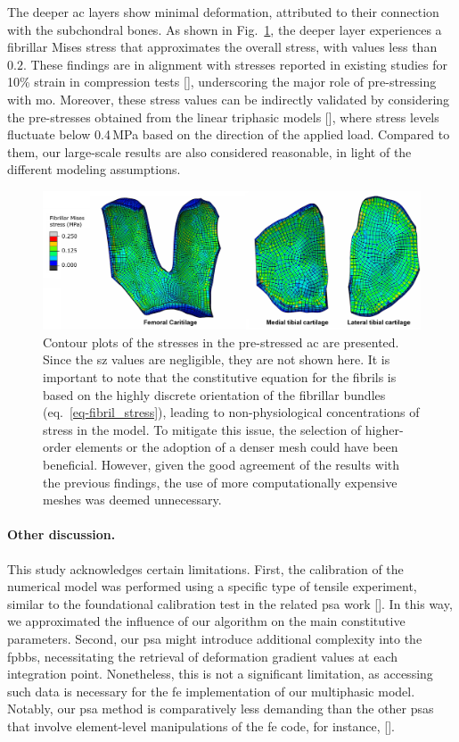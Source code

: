 The deeper \ac{ac} layers show minimal deformation, attributed to their connection with the subchondral bones. As shown in Fig.~\ref{fig:components}, the deeper layer experiences a fibrillar Mises stress that approximates the overall stress, with values less than $0.2$. These findings are in alignment with stresses reported in existing studies for 10\% strain in compression tests [\cite{sajjadinia2019}], underscoring the major role of pre-stressing with \ac{mo}. Moreover, these stress values can be indirectly validated by considering the pre-stresses obtained from the linear triphasic models [\cite{lai1991,setton1996}], where stress levels fluctuate below 0.4\,MPa based on the direction of the applied load. Compared to them, our large-scale results are also considered reasonable, in light of the different modeling assumptions.
%
\begin{figure}[b!]\centering
\includegraphics[width=\textwidth]{img/components.jpg}
\caption{Contour plots of the stresses in the pre-stressed \ac{ac} are presented. Since the \ac{sz} values are negligible, they are not shown here. It is important to note that the constitutive equation for the fibrils is based on the highly discrete orientation of the fibrillar bundles (eq.~\ref{eq-fibril_stress}), leading to non-physiological concentrations of stress in the model. To mitigate this issue, the selection of higher-order elements or the adoption of a denser mesh could have been beneficial. However, given the good agreement of the results with the previous findings, the use of more computationally expensive meshes was deemed unnecessary.}
\label{fig:components}
\end{figure}

\paragraph{Other discussion.} This study acknowledges certain limitations. First, the calibration of the numerical model was performed using a specific type of tensile experiment, similar to the foundational calibration test in the related \ac{psa} work [\cite{wang2018}]. In this way, we approximated the influence of our algorithm on the main constitutive parameters. Second, our \ac{psa} might introduce additional complexity into the \ac{fpbbs}, necessitating the retrieval of deformation gradient values at each integration point. Nonetheless, this is not a significant limitation, as accessing such data is necessary for the \ac{fe} implementation of our multiphasic model. Notably, our \ac{psa} method is comparatively less demanding than the other \acp{psa} that involve element-level manipulations of the \ac{fe} code, for instance, [\cite{pierce2015,weisbecker2014}].

